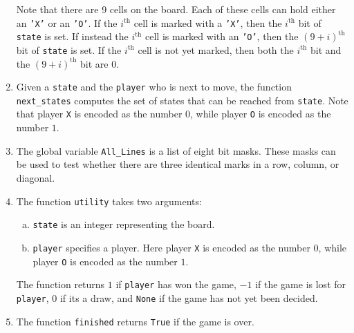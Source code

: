 \begin{enumerate}
      Note that there are 9 cells on the board.  Each of these cells can hold either an \texttt{'X'} or an
      \texttt{'O'}.  If the $i^\textrm{th}$ cell is marked with a \texttt{'X'}, then the $i^\textrm{th}$ bit of
      \texttt{state} is set.  If instead the $i^\textrm{th}$ cell is marked with an \texttt{'O'}, then the
      $(9+i)^\textrm{th}$ bit of \texttt{state} is set.  If the $i^\textrm{th}$ cell is not yet marked, then both the
      $i^\textrm{th}$ bit and the $(9+i)^\textrm{th}$ bit are $0$.   
\item Given a \texttt{state} and the \texttt{player} who is next to move, the function \texttt{next\_states}
      computes the set of states that can be reached from \texttt{state}.  Note that player \texttt{X} is
      encoded as the number $0$, while player \texttt{O} is encoded as the number $1$.
\item The global variable \texttt{All\_Lines} is a list of eight bit masks.  These masks can be used to test
      whether there are three identical marks in a row, column, or diagonal. 
\item The function \texttt{utility} takes two arguments:
      \begin{enumerate}[(a)]
      \item \texttt{state}  is an integer representing the board.
      \item \texttt{player} specifies a player. Here player \texttt{X} is encoded as the number $0$, while
            player \texttt{O} is encoded as the number $1$.
      \end{enumerate}
      The function returns $1$ if \texttt{player} has won the game, $-1$ if the game is lost for
      \texttt{player}, $0$ if its a draw, and \texttt{None} if the game has not yet been decided.
\item The function \texttt{finished} returns \texttt{True} if the game is over.
\end{enumerate}

